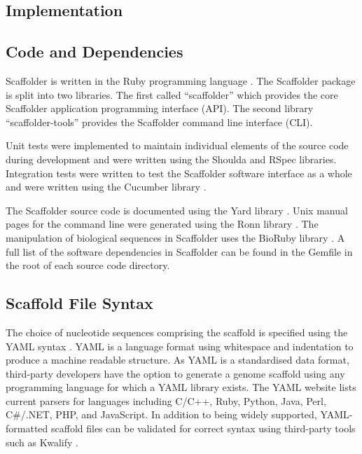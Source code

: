 \documentclass[10pt]{bmc_article}
\newenvironment{bmcformat}{\begin{raggedright}\baselineskip20pt\sloppy\setboolean{publ}{false}}{\end{raggedright}\baselineskip20pt\sloppy}
\begin{document}
\begin{bmcformat}
\clearpage

\section*{Implementation} %

\subsection*{Code and Dependencies} %

Scaffolder is written in the Ruby programming language  \cite{ruby-lang}. The
Scaffolder package is split into two libraries. The first called ``scaffolder''
which provides the core Scaffolder application programming interface (API). The
second library ``scaffolder-tools'' provides the Scaffolder command line
interface (CLI). \pb

Unit tests were implemented to maintain individual elements of the source code
during development and were written using the Shoulda and RSpec \cite{rspec}
libraries. Integration tests were written to test the Scaffolder software
interface as a whole and were written using the Cucumber library \cite{rspec}.
\pb

The Scaffolder source code is documented using the Yard library \cite{yard}.
Unix manual pages for the command line were generated using the Ronn library
\cite{ronn}. The manipulation of biological sequences in Scaffolder uses the
BioRuby library \cite{goto2010}. A full list of the software dependencies in
Scaffolder can be found in the Gemfile in the root of each source code
directory. \pb

\subsection*{Scaffold File Syntax} %

The choice of nucleotide sequences comprising the scaffold is specified using
the YAML syntax \cite{yaml}. YAML is a language format using whitespace and
indentation to produce a machine readable structure. As YAML is a standardised
data format, third-party developers have the option to generate a genome
scaffold using any programming language for which a YAML library exists. The
YAML website lists current parsers for languages including C/C++, Ruby, Python,
Java, Perl, C\#/.NET, PHP, and JavaScript. In addition to being widely
supported, YAML-formatted scaffold files can be validated for correct syntax
using third-party tools such as Kwalify \cite{kwalify}. \pb


\end{bmcformat}
\end{document}
